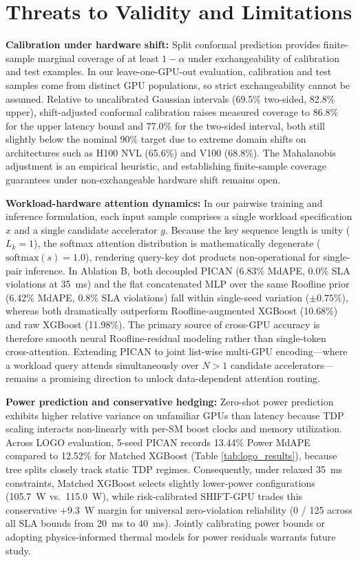 \documentclass[preprint,12pt]{elsarticle}
\begin{document}
\section{Threats to Validity and Limitations}
\label{sec:threats}

\textbf{Calibration under hardware shift:}
Split conformal prediction provides finite-sample marginal coverage of at least $1-\alpha$ under exchangeability of calibration and test examples. In our leave-one-GPU-out evaluation, calibration and test samples come from distinct GPU populations, so strict exchangeability cannot be assumed. Relative to uncalibrated Gaussian intervals (69.5\% two-sided, 82.8\% upper), shift-adjusted conformal calibration raises measured coverage to 86.8\% for the upper latency bound and 77.0\% for the two-sided interval, both still slightly below the nominal 90\% target due to extreme domain shifts on architectures such as H100 NVL (65.6\%) and V100 (68.8\%). The Mahalanobis adjustment is an empirical heuristic, and establishing finite-sample coverage guarantees under non-exchangeable hardware shift remains open.

\textbf{Workload-hardware attention dynamics:}
In our pairwise training and inference formulation, each input sample comprises a single workload specification $x$ and a single candidate accelerator $g$. Because the key sequence length is unity ($L_k = 1$), the softmax attention distribution is mathematically degenerate ($\mathrm{softmax}(s) = 1.0$), rendering query-key dot products non-operational for single-pair inference. In Ablation B, both decoupled PICAN (6.83\% MdAPE, 0.0\% SLA violations at 35~ms) and the flat concatenated MLP over the same Roofline prior (6.42\% MdAPE, 0.8\% SLA violations) fall within single-seed variation ($\pm 0.75\%$), whereas both dramatically outperform Roofline-augmented XGBoost (10.68\%) and raw XGBoost (11.98\%). The primary source of cross-GPU accuracy is therefore smooth neural Roofline-residual modeling rather than single-token cross-attention. Extending PICAN to joint list-wise multi-GPU encoding---where a workload query attends simultaneously over $N > 1$ candidate accelerators---remains a promising direction to unlock data-dependent attention routing.

\textbf{Power prediction and conservative hedging:}
Zero-shot power prediction exhibits higher relative variance on unfamiliar GPUs than latency because TDP scaling interacts non-linearly with per-SM boost clocks and memory utilization. Across LOGO evaluation, 5-seed PICAN records 13.44\% Power MdAPE compared to 12.52\% for Matched XGBoost (Table \ref{tab:logo_results}), because tree splits closely track static TDP regimes. Consequently, under relaxed 35~ms constraints, Matched XGBoost selects slightly lower-power configurations (105.7~W vs.\ 115.0~W), while risk-calibrated SHIFT-GPU trades this conservative +9.3~W margin for universal zero-violation reliability (0 / 125 across all SLA bounds from 20~ms to 40~ms). Jointly calibrating power bounds or adopting physics-informed thermal models for power residuals warrants future study.
\end{document}
